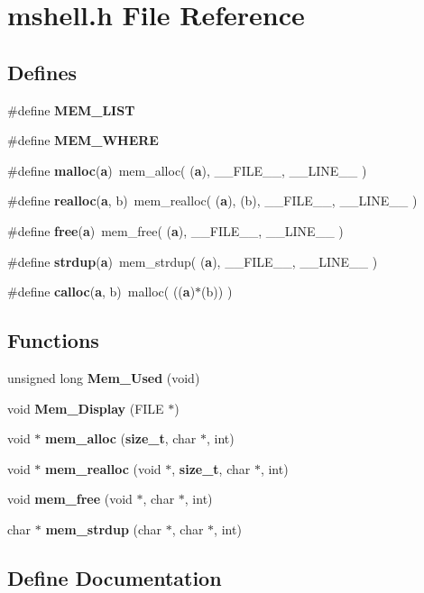 \section{mshell.h File Reference}
\label{mshell_8h}
\subsection*{Defines}
\begin{CompactItemize}
\item 
\#define {\bf MEM\_\-LIST}
\item 
\#define {\bf MEM\_\-WHERE}
\item 
\#define {\bf malloc}({\bf a})\ mem\_\-alloc( ({\bf a}), \_\-\_\-FILE\_\-\_\-, \_\-\_\-LINE\_\-\_\- )
\item 
\#define {\bf realloc}({\bf a}, b)\ mem\_\-realloc( ({\bf a}), (b), \_\-\_\-FILE\_\-\_\-, \_\-\_\-LINE\_\-\_\- )
\item 
\#define {\bf free}({\bf a})\ mem\_\-free( ({\bf a}), \_\-\_\-FILE\_\-\_\-, \_\-\_\-LINE\_\-\_\- )
\item 
\#define {\bf strdup}({\bf a})\ mem\_\-strdup( ({\bf a}), \_\-\_\-FILE\_\-\_\-, \_\-\_\-LINE\_\-\_\- )
\item 
\#define {\bf calloc}({\bf a}, b)\ malloc( (({\bf a})$\ast$(b)) )
\end{CompactItemize}
\subsection*{Functions}
\begin{CompactItemize}
\item 
unsigned long {\bf Mem\_\-Used} (void)
\item 
void {\bf Mem\_\-Display} (FILE $\ast$)
\item 
void $\ast$ {\bf mem\_\-alloc} ({\bf size\_\-t}, char $\ast$, int)
\item 
void $\ast$ {\bf mem\_\-realloc} (void $\ast$, {\bf size\_\-t}, char $\ast$, int)
\item 
void {\bf mem\_\-free} (void $\ast$, char $\ast$, int)
\item 
char $\ast$ {\bf mem\_\-strdup} (char $\ast$, char $\ast$, int)
\end{CompactItemize}


\subsection{Define Documentation}
